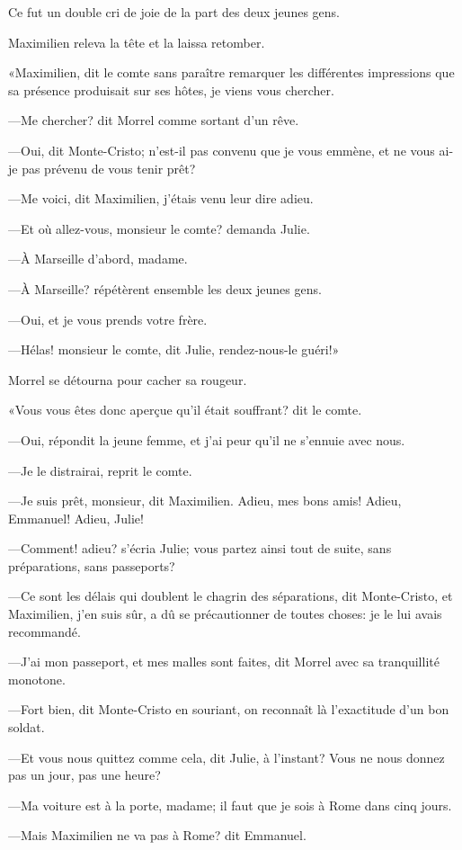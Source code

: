 Ce fut un double cri de joie de la part des deux jeunes gens. 

Maximilien releva la tête et la laissa retomber. 

«Maximilien, dit le comte sans paraître remarquer les différentes impressions que sa présence produisait sur ses hôtes, je viens vous chercher. 

—Me chercher? dit Morrel comme sortant d'un rêve. 

—Oui, dit Monte-Cristo; n'est-il pas convenu que je vous emmène, et ne vous ai-je pas prévenu de vous tenir prêt? 

—Me voici, dit Maximilien, j'étais venu leur dire adieu. 

—Et où allez-vous, monsieur le comte? demanda Julie. 

—À Marseille d'abord, madame. 

—À Marseille? répétèrent ensemble les deux jeunes gens. 

—Oui, et je vous prends votre frère. 

—Hélas! monsieur le comte, dit Julie, rendez-nous-le guéri!» 

Morrel se détourna pour cacher sa rougeur. 

«Vous vous êtes donc aperçue qu'il était souffrant? dit le comte. 

—Oui, répondit la jeune femme, et j'ai peur qu'il ne s'ennuie avec nous. 

—Je le distrairai, reprit le comte. 

—Je suis prêt, monsieur, dit Maximilien. Adieu, mes bons amis! Adieu, Emmanuel! Adieu, Julie! 

—Comment! adieu? s'écria Julie; vous partez ainsi tout de suite, sans préparations, sans passeports? 

—Ce sont les délais qui doublent le chagrin des séparations, dit Monte-Cristo, et Maximilien, j'en suis sûr, a dû se précautionner de toutes choses: je le lui avais recommandé. 

—J'ai mon passeport, et mes malles sont faites, dit Morrel avec sa tranquillité monotone. 

—Fort bien, dit Monte-Cristo en souriant, on reconnaît là l'exactitude d'un bon soldat. 

—Et vous nous quittez comme cela, dit Julie, à l'instant? Vous ne nous donnez pas un jour, pas une heure? 

—Ma voiture est à la porte, madame; il faut que je sois à Rome dans cinq jours. 

—Mais Maximilien ne va pas à Rome? dit Emmanuel. 

